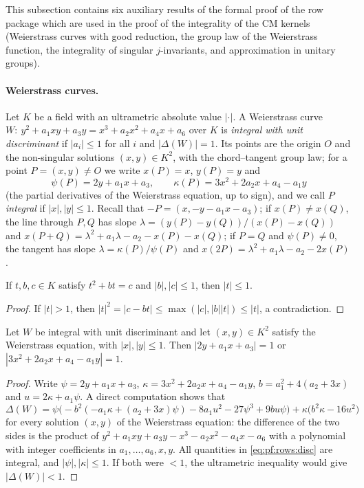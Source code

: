 This subsection contains six auxiliary results of the formal proof of the row package which are used in the proof of the
integrality of the CM kernels (Weierstrass curves with good reduction, the group law of the Weierstrass function, the
integrality of singular $j$-invariants, and approximation in unitary groups).

\paragraph{Weierstrass curves.}
Let $K$ be a field with an ultrametric absolute value $|\cdot|$. A Weierstrass curve
$W:\ y^2+a_1xy+a_3y=x^3+a_2x^2+a_4x+a_6$ over $K$ is \emph{integral with unit discriminant} if $|a_i|\le1$ for all $i$ and
$|\Delta(W)|=1$. Its points are the origin $O$ and the non-singular solutions $(x,y)\in K^2$, with the chord--tangent group
law; for a point $P=(x,y)\ne O$ we write $x(P)=x$, $y(P)=y$ and
\[
\psi(P)=2y+a_1x+a_3,\qquad \kappa(P)=3x^2+2a_2x+a_4-a_1y
\]
(the partial derivatives of the Weierstrass equation, up to sign), and we call $P$ \emph{integral} if $|x|,|y|\le1$. Recall
that $-P=(x,-y-a_1x-a_3)$; if $x(P)\ne x(Q)$, the line through $P,Q$ has slope $\lambda=(y(P)-y(Q))/(x(P)-x(Q))$ and
$x(P+Q)=\lambda^2+a_1\lambda-a_2-x(P)-x(Q)$; if $P=Q$ and $\psi(P)\ne0$, the tangent has slope $\lambda=\kappa(P)/\psi(P)$
and $x(2P)=\lambda^2+a_1\lambda-a_2-2x(P)$.

\begin{lemma}\label{pf:rows:quad}
If $t,b,c\in K$ satisfy $t^2+bt=c$ and $|b|,|c|\le1$, then $|t|\le1$.
\end{lemma}

\begin{proof}
If $|t|>1$, then $|t|^2=|c-bt|\le\max(|c|,|b||t|)\le|t|$, a contradiction.
\end{proof}

\begin{lemma}\label{pf:rows:ns}
Let $W$ be integral with unit discriminant and let $(x,y)\in K^2$ satisfy the Weierstrass equation, with $|x|,|y|\le1$. Then
$|2y+a_1x+a_3|=1$ or $|3x^2+2a_2x+a_4-a_1y|=1$.
\end{lemma}

\begin{proof}
Write $\psi=2y+a_1x+a_3$, $\kappa=3x^2+2a_2x+a_4-a_1y$, $b=a_1^2+4(a_2+3x)$ and $u=2\kappa+a_1\psi$. A direct computation shows
that
\begin{equation}\label{eq:pf:rows:disc}
\Delta(W)=\psi\bigl(-b^2(-a_1\kappa+(a_2+3x)\psi)-8a_1u^2-27\psi^3+9bu\psi\bigr)+\kappa\bigl(b^2\kappa-16u^2\bigr)
\end{equation}
for every solution $(x,y)$ of the Weierstrass equation: the difference of the two sides is the product of
$y^2+a_1xy+a_3y-x^3-a_2x^2-a_4x-a_6$ with a polynomial with integer coefficients in $a_1,\dots,a_6,x,y$. All quantities in
\eqref{eq:pf:rows:disc} are integral, and $|\psi|,|\kappa|\le1$. If both were $<1$, the ultrametric inequality would give
$|\Delta(W)|<1$.
\end{proof}


